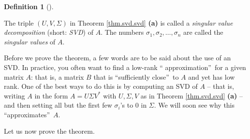 \documentclass[numbers=enddot,12pt,final,onecolumn,notitlepage]{scrartcl}%
\numberwithin{exer}{subsection}
\theoremstyle{definition}
\newtheorem{defi}[theo]{Definition}
\newenvironment{definition}[1][]
{\begin{defi}[#1]\begin{leftbar}}
{\end{leftbar}\end{defi}}
\begin{document}
\begin{definition}
The triple $\left(  U,V,\Sigma\right)  $ in Theorem \ref{thm.svd.svd}
\textbf{(a)} is called a \emph{singular value decomposition} (short:
\emph{SVD}) of $A$. The numbers $\sigma_{1},\sigma_{2},\ldots,\sigma_{n}$ are
called the \emph{singular values} of $A$.
\end{definition}

Before we prove the theorem, a few words are to be said about the use of an
SVD. In practice, you often want to find a low-rank \textquotedblleft
approximation\textquotedblright\ for a given matrix $A$: that is, a matrix $B$
that is \textquotedblleft sufficiently close\textquotedblright\ to $A$ and yet
has low rank. One of the best ways to do this is by computing an SVD of $A$ --
that is, writing $A$ in the form $A=U\Sigma V^{\ast}$ with $U,\Sigma,V$ as in
Theorem \ref{thm.svd.svd} \textbf{(a)} -- and then setting all but the first
few $\sigma_{i}$'s to $0$ in $\Sigma$. We will soon see why this
\textquotedblleft approximates\textquotedblright\ $A$.

Let us now prove the theorem.
\end{document}
